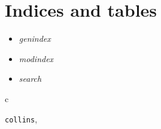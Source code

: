 \documentclass[letterpaper,10pt,english]{sphinxmanual}
\begin{document}
\chapter{Indices and tables}
\label{index:indices-and-tables}\begin{itemize}
\item {} 
\emph{genindex}

\item {} 
\emph{modindex}

\item {} 
\emph{search}

\end{itemize}


\renewcommand{\indexname}{Python Module Index}
\begin{theindex}
\def\bigletter#1{{\Large\sffamily#1}\nopagebreak\vspace{1mm}}
\bigletter{c}
\item {\texttt{collins}}, \pageref{collins:module-collins}
\end{theindex}

\renewcommand{\indexname}{Index}
\printindex
\end{document}
